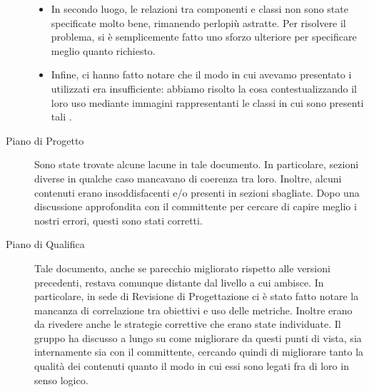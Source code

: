 \begin{description}
\begin{itemize}
				\item In secondo luogo, le relazioni tra componenti e classi non sono state specificate molto bene, rimanendo perlopiù astratte. Per risolvere il problema, si è semplicemente fatto uno sforzo ulteriore per specificare meglio quanto richiesto.
				\item Infine, ci hanno fatto notare che il modo in cui avevamo presentato i  utilizzati era insufficiente: abbiamo risolto la cosa contestualizzando il loro uso mediante immagini rappresentanti le classi in cui sono presenti tali .
			\end{itemize}
			\item[Piano di Progetto] Sono state trovate alcune lacune in tale documento. In particolare, sezioni diverse in qualche caso mancavano di coerenza tra loro. Inoltre, alcuni contenuti erano insoddisfacenti e/o presenti in sezioni sbagliate. Dopo una discussione approfondita con il committente per cercare di capire meglio i nostri errori, questi sono stati corretti.
			\item[Piano di Qualifica] Tale documento, anche se parecchio migliorato rispetto alle versioni precedenti, restava comunque distante dal livello a cui ambisce. In particolare, in sede di Revisione di Progettazione ci è stato fatto notare la mancanza di correlazione tra obiettivi e uso delle metriche. Inoltre erano da rivedere anche le strategie correttive che erano state individuate. Il gruppo ha discusso a lungo su come migliorare da questi punti di vista, sia internamente sia con il committente, cercando quindi di migliorare tanto la qualità dei contenuti quanto il modo in cui essi sono legati fra di loro in senso logico.
		\end{description}
		
